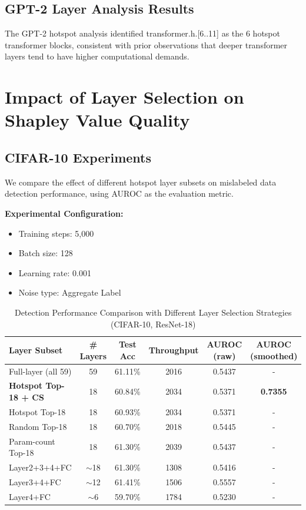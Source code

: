 \documentclass[12pt,a4paper]{report}
\begin{document}
\subsection{GPT-2 Layer Analysis Results}
\label{sec:gpt_hotspot}

The GPT-2 hotspot analysis identified transformer.h.[6..11] as the 6 hotspot transformer blocks, consistent with prior observations that deeper transformer layers tend to have higher computational demands.

\section{Impact of Layer Selection on Shapley Value Quality}
\label{sec:layer_impact}

\subsection{CIFAR-10 Experiments}
\label{sec:cifar_exp}

We compare the effect of different hotspot layer subsets on mislabeled data detection performance, using AUROC as the evaluation metric.

\bigskip
\noindent \textbf{Experimental Configuration:}

\begin{itemize}
    \item Training steps: 5,000
    \item Batch size: 128
    \item Learning rate: 0.001
    \item Noise type: Aggregate Label
\end{itemize}

\begin{table}[htbp]
    \centering
    \caption{Detection Performance Comparison with Different Layer Selection Strategies (CIFAR-10, ResNet-18)}
    \begin{tabular}{lccccc}
        \toprule
        \textbf{Layer Subset} & \textbf{\# Layers} & \textbf{Test Acc} & \textbf{Throughput} & \textbf{AUROC (raw)} & \textbf{AUROC (smoothed)} \\
        \midrule
        Full-layer (all 59) & 59 & 61.11\% & 2016 & 0.5437 & - \\
        \textbf{Hotspot Top-18 + CS} & 18 & 60.84\% & 2034 & 0.5371 & \textbf{0.7355} \\
        Hotspot Top-18 & 18 & 60.93\% & 2034 & 0.5371 & - \\
        Random Top-18 & 18 & 60.70\% & 2018 & 0.5445 & - \\
        Param-count Top-18 & 18 & 61.30\% & 2039 & 0.5437 & - \\
        Layer2+3+4+FC & $\sim$18 & 61.30\% & 1308 & 0.5416 & - \\
        Layer3+4+FC & $\sim$12 & 61.41\% & 1506 & 0.5557 & - \\
        Layer4+FC & $\sim$6 & 59.70\% & 1784 & 0.5230 & - \\
        \bottomrule
    \end{tabular}
    \label{tab:layer_comparison}
\end{table}
\end{document}
